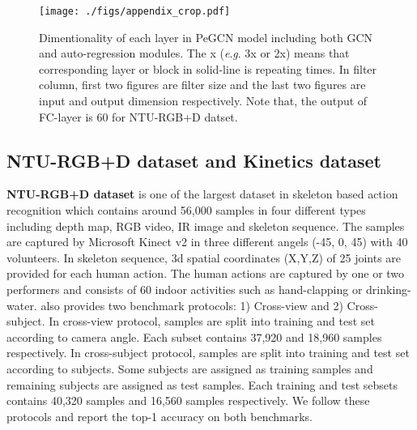 \documentclass[runningheads]{llncs}
\newcommand{\eg}{\textit{e}.\textit{g}. }
\begin{document}
\begin{figure*}
	\vspace{-1cm}
	\begin{center}
		\centerline{\texttt{[image: ./figs/appendix\_crop.pdf]}}
		\caption{Dimentionality of each layer in PeGCN model including both GCN and auto-regression modules. 
		The x (\eg 3x or 2x) means that corresponding layer or block in solid-line  is repeating  times.
		In filter column, first two figures are filter size and the last two figures are input and output dimension respectively.
		Note that, the output of FC-layer is 60 for NTU-RGB+D datset.}
	\end{center}
	\vspace{-8ex}
\end{figure*}



\newpage
\subsection{NTU-RGB+D dataset and Kinetics dataset}
\label{apx:2}
\textbf{NTU-RGB+D dataset} \cite{shahroudy2016ntu} is one of the largest dataset in skeleton based action recognition which contains around 56,000 samples in four different types including depth map, RGB video, IR image and skeleton sequence.  The samples are captured by Microsoft Kinect v2 in three different angels (-45, 0, 45) with 40 volunteers. In skeleton sequence, 3d spatial coordinates (X,Y,Z) of 25 joints are provided for each human action. The human actions are captured by one or two performers and consists of 60 indoor activities such as hand-clapping or drinking-water. \cite{shahroudy2016ntu} also provides two benchmark protocols: 1) Cross-view and 2) Cross-subject.  In cross-view protocol, samples are split into training and test set according to camera angle. Each subset contains 37,920 and 18,960 samples respectively. In cross-subject protocol, samples are split into training and test set according to subjects. Some subjects are assigned as training samples and remaining subjects are assigned as test samples. Each training and test sebsets contains 40,320 samples and 16,560 samples respectively. We follow these protocols and report the top-1 accuracy on both benchmarks.
\end{document}
